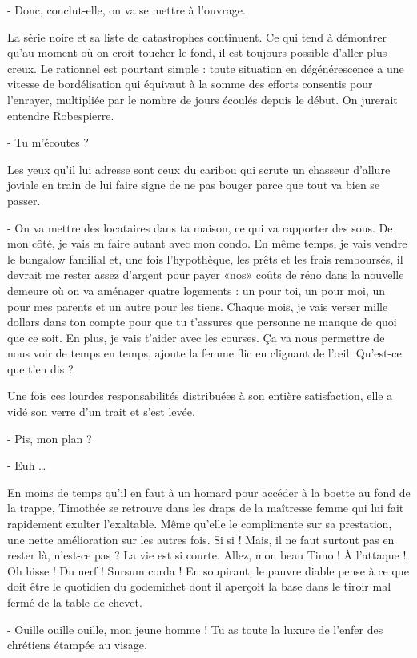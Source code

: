 - Donc, conclut-elle, on va se mettre à l’ouvrage.

La série noire et sa liste de catastrophes continuent. Ce qui tend à démontrer qu’au moment où on croit toucher le fond, il est toujours possible d’aller plus creux. Le rationnel est pourtant simple : toute situation en dégénérescence a une vitesse de bordélisation qui équivaut à la somme des efforts consentis pour l’enrayer, multipliée par le nombre de jours écoulés depuis le début. On jurerait entendre Robespierre.

- Tu m’écoutes ?

Les yeux qu’il lui adresse sont ceux du caribou qui scrute un chasseur d’allure joviale en train de lui faire signe de ne pas bouger parce que tout va bien se passer.

- On va mettre des locataires dans ta maison, ce qui va rapporter des sous. De mon côté, je vais en faire autant avec mon condo. En même temps, je vais vendre le bungalow familial et, une fois l’hypothèque, les prêts et les frais remboursés, il devrait me rester assez d’argent pour payer «nos» coûts de réno dans la nouvelle demeure où on va aménager quatre logements : un pour toi, un pour moi, un pour mes parents et un autre pour les tiens. Chaque mois, je vais verser mille dollars dans ton compte pour que tu t’assures que personne ne manque de quoi que ce soit. En plus, je vais t’aider avec les courses. Ça va nous permettre de nous voir de temps en temps, ajoute la femme flic en clignant de l’œil. Qu’est-ce que t’en dis ?

Une fois ces lourdes responsabilités distribuées à son entière satisfaction, elle a vidé son verre d’un trait et s’est levée.

- Pis, mon plan ?

- Euh …

En moins de temps qu’il en faut à un homard pour accéder à la boette au fond de la trappe, Timothée se retrouve dans les draps de la maîtresse femme qui lui fait rapidement exulter l’exaltable. Même qu’elle le complimente sur sa prestation, une nette amélioration sur les autres fois. Si si ! Mais, il ne faut surtout pas en rester là, n’est-ce pas ? La vie est si courte. Allez, mon beau Timo ! À l’attaque ! Oh hisse ! Du nerf ! Sursum corda ! En soupirant, le pauvre diable pense à ce que doit être le quotidien du godemichet dont il aperçoit la base dans le tiroir mal fermé de la table de chevet.

- Ouille ouille ouille, mon jeune homme ! Tu as toute la luxure de l’enfer des chrétiens étampée au visage.

